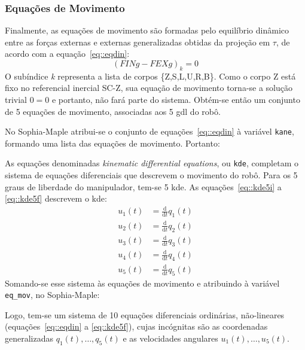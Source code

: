\subsubsection{Equações de Movimento}

Finalmente, as equações de movimento são formadas pelo equilíbrio dinâmico entre
as forças externas e externas generalizadas obtidas da projeção em $\tau$, de
acordo com a equação~\ref{eq::eqdin}:
%
\begin{equation}
	(FINg - FEXg)_{k} = 0 \label{eq::eqdin}
\end{equation}
%
O subíndice \textit{k} representa a lista de corpos \{Z,S,L,U,R,B\}. Como o
corpo Z está fixo no referencial inercial SC-Z, sua equação de movimento
torna-se a solução trivial $0=0$ e portanto, não fará parte do sistema. Obtém-se
então um conjunto de 5 equações de movimento, associadas aos 5 gdl do robô.

No Sophia-Maple atribui-se o conjunto de equações~\ref{eq::eqdin} à
variável \texttt{kane}, formando uma lista das equações de movimento. Portanto:

\bigskip {} \bigskip

As equações denominadas \textit{kinematic differential equations}, ou
\texttt{kde}, completam o sistema de equações diferenciais que descrevem o
movimento do robô.
Para os 5 graus de liberdade do manipulador, tem-se 5 kde. As
equações~\ref{eq::kde5i} a \ref{eq::kde5f} descrevem o kde:
%
\begin{align}
	u_{1}(t) &= \frac{\mathrm{d} }{\mathrm{d} t}q_{1}(t) \label{eq::kde5i} \\
	u_{2}(t) &= \frac{\mathrm{d} }{\mathrm{d} t}q_{2}(t) \\
	u_{3}(t) &= \frac{\mathrm{d} }{\mathrm{d} t}q_{3}(t) \\
	u_{4}(t) &= \frac{\mathrm{d} }{\mathrm{d} t}q_{4}(t) \\
	u_{5}(t) &= \frac{\mathrm{d} }{\mathrm{d} t}q_{5}(t) \label{eq::kde5f}	
\end{align}
%
Somando-se esse sistema às equações de movimento e atribuindo à variável
\texttt{eq\_mov}, no Sophia-Maple:

\bigskip {} \bigskip

Logo, tem-se um sistema de 10 equações diferenciais ordinárias, não-lineares
(equações~\ref{eq::eqdin} a \ref{eq::kde5f}), cujas incógnitas são as
coordenadas generalizadas $q_{1}(t),\ldots, q_{5}(t)$ e as velocidades angulares
$u_{1}(t),\ldots, u_{5}(t)$.

